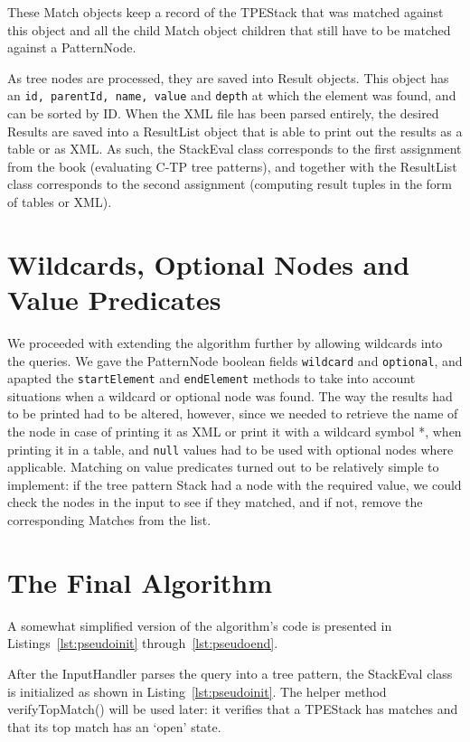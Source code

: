 \documentclass[11pt]{article}
\begin{document}
These Match objects keep a record of the TPEStack that was matched against this object and all the child Match object children that still have to be matched against a PatternNode. 

As tree nodes are processed, they are saved into Result objects. This object has an \lstinline{id, parentId, name, value} and \lstinline{depth} at which the element was found, and can be sorted by ID. When the XML file has been parsed entirely, the desired Results are saved into a ResultList object that is able to print out the results as a table or as XML. As such, the StackEval class corresponds to the first assignment from the book (evaluating C-TP tree patterns), and together with the ResultList class corresponds to the second assignment (computing result tuples in the form of tables or XML).

\section{Wildcards, Optional Nodes and Value Predicates}
We proceeded with extending the algorithm further by allowing wildcards into the queries. We gave the PatternNode boolean fields \lstinline{wildcard} and \lstinline{optional}, and apapted the \lstinline{startElement} and \lstinline{endElement} methods to take into account situations when a wildcard or optional node was found. The way the results had to be printed had to be altered, however, since we needed to retrieve the name of the node in case of printing it as XML or print it with a wildcard symbol *, when printing it in a table, and \lstinline{null} values had to be used with optional nodes where applicable.
Matching on value predicates turned out to be relatively simple to implement: if the tree pattern Stack had a node with the required value, we could check the nodes  in the input to see if they matched, and if not, remove the corresponding Matches from the list.

\section{The Final Algorithm}
A somewhat simplified version of the algorithm's code is presented in Listings~\ref{lst:pseudoinit} through~\ref{lst:pseudoend}. 

After the InputHandler parses the query into a tree pattern, the StackEval class is initialized as shown in Listing~\ref{lst:pseudoinit}. The helper method verifyTopMatch() will be used later: it verifies that a TPEStack has matches and that its top match has an `open' state.\\
\end{document}
